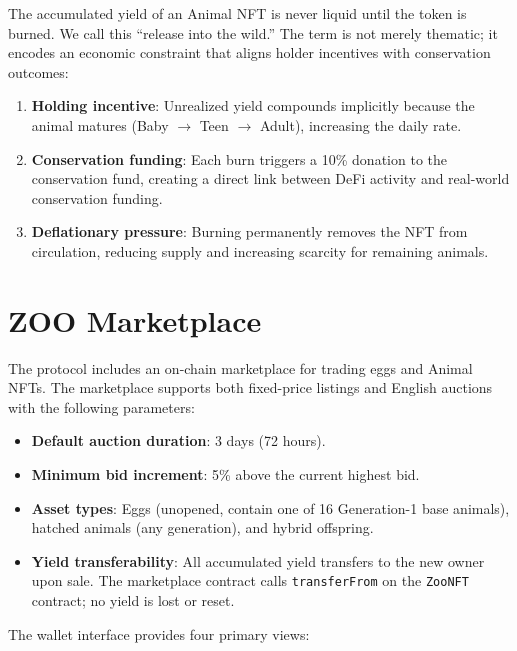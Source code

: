 \documentclass[11pt,letterpaper]{article}
\begin{document}
The accumulated yield of an Animal NFT is never liquid until the token is burned.  We call
this ``release into the wild.''  The term is not merely thematic; it encodes an economic
constraint that aligns holder incentives with conservation outcomes:

\begin{enumerate}
    \item \textbf{Holding incentive}: Unrealized yield compounds implicitly because the
          animal matures (Baby $\to$ Teen $\to$ Adult), increasing the daily rate.
    \item \textbf{Conservation funding}: Each burn triggers a 10\% donation to the
          conservation fund, creating a direct link between DeFi activity and real-world
          conservation funding.
    \item \textbf{Deflationary pressure}: Burning permanently removes the NFT from
          circulation, reducing supply and increasing scarcity for remaining animals.
\end{enumerate}

\section{ZOO Marketplace}
\label{sec:marketplace}

The protocol includes an on-chain marketplace for trading eggs and Animal NFTs.  The
marketplace supports both fixed-price listings and English auctions with the following
parameters:

\begin{itemize}
    \item \textbf{Default auction duration}: 3 days (72 hours).
    \item \textbf{Minimum bid increment}: 5\% above the current highest bid.
    \item \textbf{Asset types}: Eggs (unopened, contain one of 16 Generation-1 base
          animals), hatched animals (any generation), and hybrid offspring.
    \item \textbf{Yield transferability}: All accumulated yield transfers to the new
          owner upon sale.  The marketplace contract calls \texttt{transferFrom} on the
          \texttt{ZooNFT} contract; no yield is lost or reset.
\end{itemize}

The wallet interface provides four primary views:
\end{document}
